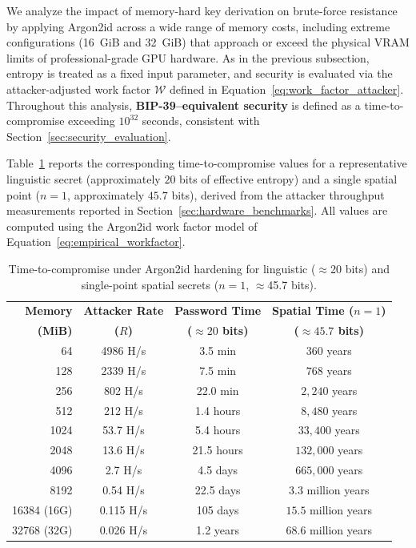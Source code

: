 \documentclass[journal,article,submit,pdftex,moreauthors]{Definitions/mdpi}
\begin{document}
We analyze the impact of memory-hard key derivation on brute-force resistance by applying Argon2id across a wide range of memory costs, including extreme configurations (16~GiB and 32~GiB) that approach or exceed the physical VRAM limits of professional-grade GPU hardware. As in the previous subsection, entropy is treated as a fixed input parameter, and security is evaluated via the attacker-adjusted work factor $\mathcal{W}$ defined in Equation~\ref{eq:work_factor_attacker}. Throughout this analysis, \textbf{BIP-39–equivalent security} is defined as a time-to-compromise exceeding $10^{32}$ seconds, consistent with Section~\ref{sec:security_evaluation}.

Table~\ref{tab:spectrum_comparison} reports the corresponding time-to-compromise values for a representative linguistic secret (approximately $20$ bits of effective entropy) and a single spatial point ($n=1$, approximately $45.7$ bits), derived from the attacker throughput measurements reported in Section~\ref{sec:hardware_benchmarks}. All values are computed using the Argon2id work factor model of Equation~\ref{eq:empirical_workfactor}.


\begin{table}[H]
\caption{Time-to-compromise under Argon2id hardening for linguistic ($\approx$20 bits) and single-point spatial secrets ($n=1$, $\approx$45.7 bits).}
\label{tab:spectrum_comparison}
\centering
\begin{tabular}{rccc}
\toprule
\textbf{Memory} & \textbf{Attacker Rate} & \textbf{Password Time} & \textbf{Spatial Time ($n=1$)} \\
\textbf{(MiB)} & \textbf{($R$)} & \textbf{($\approx 20$ bits)} & \textbf{($\approx 45.7$ bits)} \\
\midrule
64    & 4986 H/s & 3.5 min & $360$ years \\
128   & 2339 H/s & 7.5 min & $768$ years \\
256   & 802 H/s  & 22.0 min & $2{,}240$ years \\
512   & 212 H/s  & 1.4 hours & $8{,}480$ years \\
1024  & 53.7 H/s & 5.4 hours & $33{,}400$ years \\
2048  & 13.6 H/s & 21.5 hours & $132{,}000$ years \\
4096  & 2.7 H/s  & 4.5 days & $665{,}000$ years \\
8192  & 0.54 H/s & 22.5 days & $3.3$ million years \\
\midrule
\rowcolor[gray]{0.9} 16384 (16G) & 0.115 H/s & 105 days & $15.5$ million years \\
\rowcolor[gray]{0.9} 32768 (32G) & 0.026 H/s & 1.2 years & $68.6$ million years \\
\bottomrule
\end{tabular}
\end{table}
\end{document}
